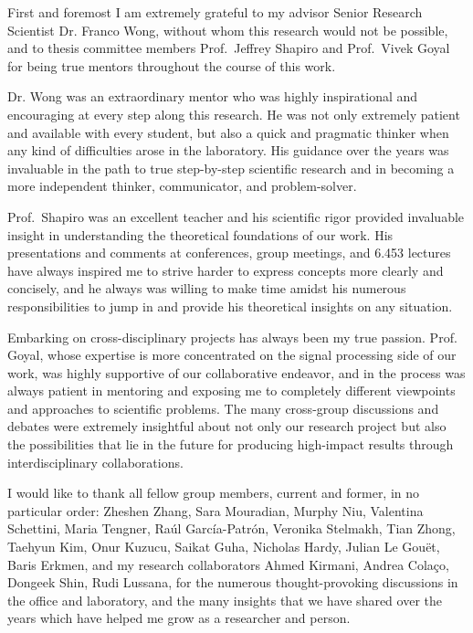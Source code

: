 First and foremost I am extremely grateful to my advisor Senior Research Scientist Dr. Franco Wong, without whom this research would not be possible, and to thesis committee members Prof.\ Jeffrey Shapiro and Prof.\ Vivek Goyal for being true mentors throughout the course of this work.

Dr. Wong was an extraordinary mentor who was highly inspirational and encouraging at every step along this research. He was not only extremely patient and available with every student, but also a quick and pragmatic thinker when any kind of difficulties arose in the laboratory. His guidance over the years was invaluable in the path to true step-by-step scientific research and in becoming a more independent thinker, communicator, and problem-solver.

Prof.\ Shapiro was an excellent teacher and his scientific rigor provided invaluable insight in understanding the theoretical foundations of our work. His presentations and comments at conferences, group meetings, and 6.453 lectures have always inspired me to strive harder to express concepts more clearly and concisely, and he always was willing to make time amidst his numerous responsibilities to jump in and provide his theoretical insights on any situation.

Embarking on cross-disciplinary projects has always been my true passion. Prof. Goyal, whose expertise is more concentrated on the signal processing side of our work, was highly supportive of our collaborative endeavor, and in the process was always patient in mentoring and exposing me to completely different viewpoints and approaches to scientific problems. The many cross-group discussions and debates were extremely insightful about not only our research project but also the possibilities that lie in the future for producing high-impact results through interdisciplinary collaborations.

I would like to thank all fellow group members, current and former, in no particular order: Zheshen Zhang, Sara Mouradian, Murphy Niu, Valentina Schettini, Maria Tengner, Ra\'{u}l Garc\'{i}a-Patr\'{o}n, Veronika Stelmakh, Tian Zhong, Taehyun Kim, Onur Kuzucu, Saikat Guha, Nicholas Hardy, Julian Le Gou\"{e}t, Baris Erkmen, and my research collaborators Ahmed Kirmani, Andrea Cola\c{c}o, Dongeek Shin, Rudi Lussana, for the numerous thought-provoking discussions in the office and laboratory, and the many insights that we have shared over the years which have helped me grow as a researcher and person.


